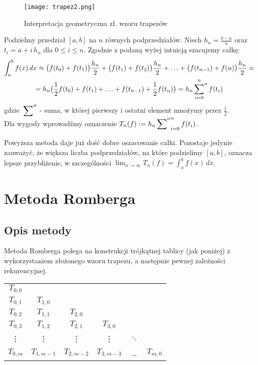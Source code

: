 \documentclass[a4paper,10pt]{article}
\newcommand*\setcaptioncitation[1]{\def\captioncitation{\textit{Źródło:}~#1}}
\let\captioncitation\relax
\begin{document}
\begin{figure}[ht]
 \centering
 \texttt{[image: trapez2.png]}
 \setcaptioncitation{\texttt{https://www.math24.net/trapezoidal-rule}}
 \caption{Interpretacja geometryczna zł. wzoru trapezów}
\end{figure}

Podzielmy przedział $[a, b]$ na $n$ równych podprzedziałów. Niech $h_n = \frac{b-a}{n}$ oraz $t_i = a + i\,h_n$ dla $0\leq i \leq n$. Zgodnie z podaną wyżej intuicją szacujemy całkę:
\begin{gather*}
\int_a^bf(x)\, dx \approx \big(f(t_0)+f(t_1)\big)\frac{h_n}{2} +  \big(f(t_1)+f(t_2)\big)\frac{h_n}{2} + \ldots + \big(f(t_{n-1})+f(n)\big)\frac{h_n}{2} = \\
= h_n\big(\frac{1}{2}f(t_0) + f(t_1) + \ldots + f(t_{n-1}) + \frac{1}{2}f(t_n)\big) = h_n \sideset{}{''}\sum_{i=0}^n f(t_i)
\end{gather*}
 gdzie $\textstyle \sideset{}{''}\sum$ - suma, w której pierwszy i ostatni element mnożymy przez $\frac{1}{2}$. \\
 Dla wygody wprowadźmy oznaczenie $T_n(f) := h_n \sideset{}{''}\sum_{i=0}^n f(t_i)$.
\vspace{5mm} %
 
 Powyższa metoda daje już dość dobre oszacowanie całki. Pozostaje jedynie zauważyć, że większa liczba podprzedziałów, na które podzielimy $[a, b]$, oznacza lepsze przybliżenie, w szczególności $\displaystyle{\lim_{n \to \infty}T_n(f) = \int_a^bf(x)\, dx}$.
 
 \section{Metoda Romberga}
    \subsection{Opis metody}
    Metoda Romberga polega na konstrukcji trójkątnej tablicy (jak poniżej) z wykorzystaniem złożonego wzoru trapezu, a następnie pewnej zależności rekurencyjnej. 
  
\begin{center}
\begin{tabular}{ c c c c c c}
 
 $T_{0,0}$ &  &  & & & \\ 
 $T_{0,1}$ & $T_{1,0}$ &  & & & \\  
 $T_{0,2}$ & $T_{1,1}$ & $T_{2,0}$ & & & \\
 $T_{0,3}$ & $T_{1,2}$ & $T_{2,1}$ & $T_{3,0}$ & & \\
 \vdots & \vdots & \vdots  & \vdots & $\ddots$ & \\
 $T_{0,m}$ & $T_{1,m-1}$ & $T_{2,m-2}$ & $T_{3,m-3}$ & \ldots & $T_{m,0}$ 
\end{tabular}
\end{center} 
 
\end{document}
